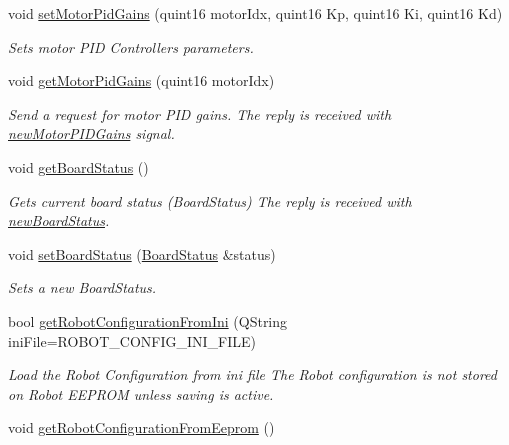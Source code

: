 \begin{DoxyCompactItemize}
void \hyperlink{classroboctrl_1_1_robo_controller_s_d_k_a32c9f23fcb8d03b79cbf8745f7bd2324}{set\-Motor\-Pid\-Gains} (quint16 motor\-Idx, quint16 Kp, quint16 Ki, quint16 Kd)
\begin{DoxyCompactList}\small\item\em Sets motor P\-I\-D Controllers parameters. \end{DoxyCompactList}\item 
void \hyperlink{classroboctrl_1_1_robo_controller_s_d_k_a64c0e778ab357964bd84a1f54232d914}{get\-Motor\-Pid\-Gains} (quint16 motor\-Idx)
\begin{DoxyCompactList}\small\item\em Send a request for motor P\-I\-D gains. The reply is received with \hyperlink{classroboctrl_1_1_robo_controller_s_d_k_a79e70831349070cde327df8ad6be33cb}{new\-Motor\-P\-I\-D\-Gains} signal. \end{DoxyCompactList}\item 
\hypertarget{classroboctrl_1_1_robo_controller_s_d_k_a851fd906016bf37f8b2b5580df18811d}{void \hyperlink{classroboctrl_1_1_robo_controller_s_d_k_a851fd906016bf37f8b2b5580df18811d}{get\-Board\-Status} ()}\label{classroboctrl_1_1_robo_controller_s_d_k_a851fd906016bf37f8b2b5580df18811d}

\begin{DoxyCompactList}\small\item\em Gets current board status (Board\-Status) The reply is received with \hyperlink{classroboctrl_1_1_robo_controller_s_d_k_af760a666eb8e891c0e158e28fab1fb3a}{new\-Board\-Status}. \end{DoxyCompactList}\item 
void \hyperlink{classroboctrl_1_1_robo_controller_s_d_k_a39fc9bf4e9444601ec184d542d9faf11}{set\-Board\-Status} (\hyperlink{struct___board_status}{Board\-Status} \&status)
\begin{DoxyCompactList}\small\item\em Sets a new Board\-Status. \end{DoxyCompactList}\item 
bool \hyperlink{classroboctrl_1_1_robo_controller_s_d_k_a4c20cb0043bfcdfb703542081e20eb3b}{get\-Robot\-Configuration\-From\-Ini} (Q\-String ini\-File=R\-O\-B\-O\-T\-\_\-\-C\-O\-N\-F\-I\-G\-\_\-\-I\-N\-I\-\_\-\-F\-I\-L\-E)
\begin{DoxyCompactList}\small\item\em Load the Robot Configuration from ini file The Robot configuration is not stored on Robot E\-E\-P\-R\-O\-M unless saving is active. \end{DoxyCompactList}\item 
\hypertarget{classroboctrl_1_1_robo_controller_s_d_k_a04db4ed91c72189732236ccd9c006564}{void \hyperlink{classroboctrl_1_1_robo_controller_s_d_k_a04db4ed91c72189732236ccd9c006564}{get\-Robot\-Configuration\-From\-Eeprom} ()}\label{classroboctrl_1_1_robo_controller_s_d_k_a04db4ed91c72189732236ccd9c006564}


\end{DoxyCompactItemize}
